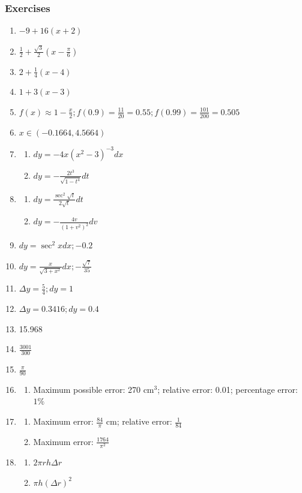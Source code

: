 \documentclass{article}
\begin{document}
\subsubsection{Exercises}
\begin{enumerate}
  \item $-9+16(x+2)$
  \item $\frac{1}{2}+\frac{\sqrt{3}}{2}\left(x-\frac{\pi}{6}\right)$
  \item $2+\frac{1}{4}(x-4)$
  \item $1+3(x-3)$
  \item $f(x)\approx1-\frac{x}{2}; f(0.9)=\frac{11}{20}=0.55; f(0.99)=\frac{101}{200}=0.505$
    \setcounter{enumi}{6}
  \item $x\in(-0.1664, 4.5664)$
    \setcounter{enumi}{10}
  \item
    \begin{enumerate}
      \item $dy=-4x(x^2-3)^{-3}dx$
      \item $dy=-\frac{2t^3}{\sqrt{1-t^4}}dt$
    \end{enumerate}
    \setcounter{enumi}{12}
  \item
    \begin{enumerate}
      \item $dy=\frac{\sec^2\sqrt{t}}{2\sqrt{t}}dt$
      \item $dy=-\frac{4v}{(1+v^2)^2}dv$
    \end{enumerate}
    \setcounter{enumi}{14}
  \item $dy=\sec^2xdx; -0.2$
    \setcounter{enumi}{16}
  \item $dy=\frac{x}{\sqrt{3+x^2}}dx; -\frac{\sqrt{7}}{35}$
    \setcounter{enumi}{18}
  \item $\Delta y = \frac{5}{4}; dy=1$
    \setcounter{enumi}{20}
  \item $\Delta y = 0.3416; dy=0.4$
    \setcounter{enumi}{22}
  \item 15.968
    \setcounter{enumi}{24}
  \item $\frac{3001}{300}$
    \setcounter{enumi}{26}
  \item $\frac{\pi}{90}$
    \setcounter{enumi}{30}
  \item
    \begin{enumerate}
      \item Maximum possible error: 270 cm$^3$; relative error: 0.01; percentage error: $1\%$
    \end{enumerate}
    \setcounter{enumi}{32}
  \item
    \begin{enumerate}
      \item Maximum error: $\frac{84}{\pi}$ cm; relative error: $\frac{1}{84}$
      \item Maximum error: $\frac{1764}{\pi^2}$
    \end{enumerate}
    \setcounter{enumi}{34}
  \item
    \begin{enumerate}
      \item $2\pi rh\Delta r$
      \item $\pi h(\Delta r)^2$
    \end{enumerate}
\end{enumerate}
\end{document}
